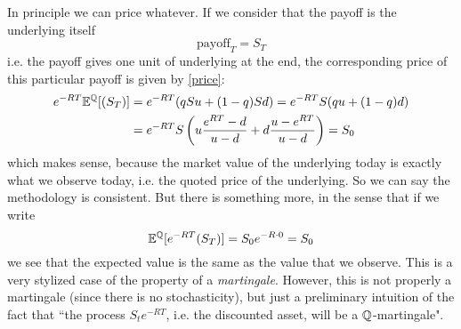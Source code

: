 \begin{remark}\label{remark}
    In principle we can price whatever. If we consider that the payoff is the underlying itself
    \begin{equation}
        \mbox{payoff}_T = S_T
    \end{equation}
    i.e. the payoff gives one unit of underlying at the end, the corresponding price of this particular payoff is given by    \eqref{price}:
    \begin{align}
        \notag e^{-RT}\mathbb{E}^{\mathbb{Q}}[(S_T)] &= e^{-RT}(qSu+(1-q)Sd) = e^{-RT}S(qu+(1-q)d) \\
        &= e^{-RT}S\left(u\frac{e^{RT}-d}{u-d}+d\frac{u-e^{RT}}{u-d}\right) = S_0
    \end{align}
    which makes sense, because the market value of the underlying today is exactly what we observe today, i.e. the quoted price of the underlying. So we can say the methodology is consistent. But there is something more, in the sense that if we write
    \begin{equation}\label{S0}
        \mathbb{E}^{\mathbb{Q}}[e^{-RT}(S_T)] = S_0e^{-R\cdot0} = S_0
    \end{equation}
    we see that the expected value is the same as the value that we observe. This is a very stylized case of the property of a \emph{martingale}. However, this is not properly a martingale (since there is no stochasticity), but just a preliminary intuition of the fact that ``the process $S_te^{-RT}$, i.e. the discounted asset, will be a $\mathbb{Q}$-martingale".
\end{remark}